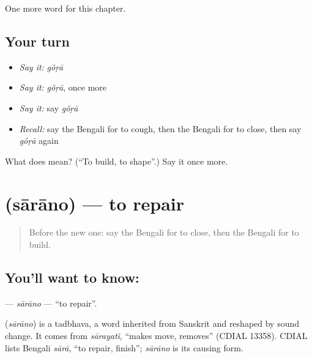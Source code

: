 \begin{grammarlens}[title={What you've built}]
One more word for this chapter.
\end{grammarlens}

\subsection*{Your turn}
\begin{itemize}
\raggedright
  \item \emph{Say it:} \emph{gôṛā}
  \item \emph{Say it:} \emph{gôṛā}, once more
  \item \emph{Say it:} say \emph{gôṛā}
  \item \emph{Recall:} say the Bengali for to cough, then the Bengali for to close, then say \emph{gôṛā} again
\end{itemize}

\begin{tcolorbox}[breakable,colback=teal!4,colframe=teal!35!black,title={Before you move on}]
What does  mean? (\textquotedblleft{}To build, to shape\textquotedblright{}.) Say it once more.
\end{tcolorbox}
\section[\texorpdfstring{\bn{সারানো} (sārāno)}{সারানো (sārāno)}]{ (sārāno) — to repair}

\label{lesson:BN-C151-sarano}



\begin{quote}
Before the new one: say the Bengali for to close, then the Bengali for to build.
\end{quote}

\subsection*{You'll want to know: }
\textbf{} — \emph{sārāno} — \textquotedblleft{}to repair\textquotedblright{}.

\begin{cousinweb}
\textbf{} (\emph{sārāno}) is a tadbhava, a word inherited from Sanskrit and reshaped by sound change. It comes from \emph{sārayati}, \textquotedblleft{}makes move, removes\textquotedblright{} (CDIAL 13358). CDIAL lists Bengali \emph{sārā}, \textquotedblleft{}to repair, finish\textquotedblright{}; \emph{sārāno} is its causing form.
\end{cousinweb}

